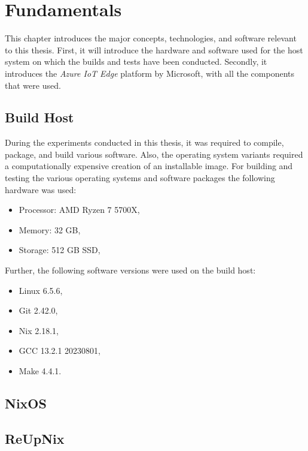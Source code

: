 \chapter{Fundamentals}
\label{sec:fundamentals}
This chapter introduces the major concepts, technologies,
and software relevant to this thesis. First, it will
introduce the hardware and software used for the host system
on which the builds and tests have been conducted.
Secondly, it introduces the \textit{Azure IoT Edge} platform
by Microsoft, with all the components that were used.

\section{Build Host}
During the experiments conducted in this thesis, it was
required to compile, package, and build various software.
Also, the operating system variants required a
computationally expensive creation of an installable image.
For building and testing the various operating systems and
software packages the following hardware was used:
\begin{itemize}
    \item Processor: AMD Ryzen 7 5700X,
    \item Memory: 32 GB,
    \item Storage: 512 GB SSD,
\end{itemize}

Further, the following software versions were used on the build host:
\begin{itemize}
    \item Linux 6.5.6,
    \item Git 2.42.0,
    \item Nix 2.18.1,
    \item GCC 13.2.1 20230801,
    \item Make 4.4.1.
\end{itemize}



\section{NixOS}

\cite{1411255}
\section{ReUpNix}

